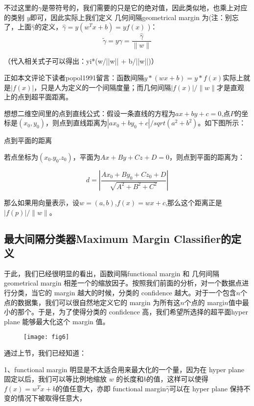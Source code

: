 \documentclass[a4paper,12pt]{article}
\begin{document}
不过这里的$\gamma$是带符号的，我们需要的只是它的绝对值，因此类似地，也乘上对应的类别 $y$即可，因此实际上我们定义 几何间隔geometrical margin 为(注：别忘了，上面$\widehat{\gamma}$的定义，$\widehat{\gamma}=y(w^Tx+b)=yf(x)$ )：
\begin{equation}
  \widetilde{\gamma}=y\gamma=\frac{\widehat{\gamma}}{\|w\|}
\end{equation}
\begin{center}
（代入相关式子可以得出：yi*(w/||w|| + b/||w||)）
\end{center}

正如本文评论下读者popol1991留言：函数间隔$y*(wx+b)=y*f(x)$实际上就是$|f(x)|$，只是人为定义的一个间隔度量；而几何间隔$|f(x)|/\|w\|$才是直观上的点到超平面距离。

想想二维空间里的点到直线公式：假设一条直线的方程为$ax+by+c=0$,点$P$的坐标是$(x_0,y_0)$，则点到直线距离为$|ax_0+by_0+c|/sqrt(a^2+b^2)$。如下图所示：

点到平面的距离

若点坐标为$(x_0.y_0.z_0)$，平面为$Ax+By+Cz+D=0$，则点到平面的距离为：

\begin{equation}
  d=\left|\frac{Ax_0+By_0+Cz_0+D}{\sqrt{A^2+B^2+C^2}}\right|
\end{equation}

那么如果用向量表示，设$w=(a,b)$,$f(x)=wx+c$,那么这个距离正是$|f(p)|/\|w\|$。

\subsection{最大间隔分类器Maximum Margin Classifier的定义}

于此，我们已经很明显的看出，函数间隔functional margin 和 几何间隔geometrical margin 相差一个的缩放因子。按照我们前面的分析，对一个数据点进行分类，当它的 margin 越大的时候，分类的 confidence 越大。对于一个包含$ n $个点的数据集，我们可以很自然地定义它的 margin 为所有这$ n $个点的 margi$n $值中最小的那个。于是，为了使得分类的 confidence 高，我们希望所选择的超平面hyper plane 能够最大化这个 margin 值。

\begin{figure}[H]
  \centering
  \texttt{[image: fig6]}
\end{figure}
通过上节，我们已经知道：

1、functional margin 明显是不太适合用来最大化的一个量，因为在 hyper plane 固定以后，我们可以等比例地缩放 $w$ 的长度和$ b $的值，这样可以使得$f(x)=w^Tx+b$的值任意大，亦即 functional margin$\widehat{\gamma}$可以在 hyper plane 保持不变的情况下被取得任意大，
\end{document}
